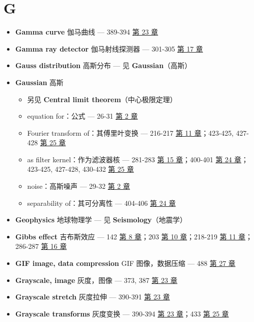 \section{G}

\begin{itemize}
\tightlist
\item
  \textbf{Gamma curve} 伽马曲线 --- 389-394 
  \hyperref[ch-23]{第 23 章}
\item
  \textbf{Gamma ray detector} 伽马射线探测器 --- 301-305 
  \hyperref[ch-17]{第 17 章}
\item
  \textbf{Gauss distribution} 高斯分布 --- 见 \textbf{Gaussian}（高斯）
\item
  \textbf{Gaussian} 高斯

  \begin{itemize}
  \tightlist
  \item
    另见 \textbf{Central limit theorem}（中心极限定理）
  \item
    equation for：公式 --- 26-31  \hyperref[ch-02]{第 2 章}
  \item
    Fourier transform of：其傅里叶变换 --- 216-217 
    \hyperref[ch-11]{第 11 章}；423-425, 427-428 
    \hyperref[ch-25]{第 25 章}
  \item
    as filter kernel：作为滤波器核 --- 281-283 
    \hyperref[ch-15]{第 15 章}；400-401  \hyperref[ch-24]{第
    24 章}；423-425, 427-428, 430-432  \hyperref[ch-25]{第 25
    章}
  \item
    noise：高斯噪声 --- 29-32  \hyperref[ch-02]{第 2 章}
  \item
    separability of：其可分离性 --- 404-406 
    \hyperref[ch-24]{第 24 章}
  \end{itemize}
\item
  \textbf{Geophysics} 地球物理学 --- 见 \textbf{Seismology}（地震学）
\item
  \textbf{Gibbs effect} 吉布斯效应 --- 142 
  \hyperref[ch-08]{第 8 章}；203  \hyperref[ch-10]{第 10
  章}；218-219  \hyperref[ch-11]{第 11 章}；286-287 
  \hyperref[ch-16]{第 16 章}
\item
  \textbf{GIF image, data compression} GIF 图像，数据压缩 --- 488
   \hyperref[ch-27]{第 27 章}
\item
  \textbf{Grayscale, image} 灰度，图像 --- 373, 387 
  \hyperref[ch-23]{第 23 章}
\item
  \textbf{Grayscale stretch} 灰度拉伸 --- 390-391 
  \hyperref[ch-23]{第 23 章}
\item
  \textbf{Grayscale transforms} 灰度变换 --- 390-394 
  \hyperref[ch-23]{第 23 章}；433  \hyperref[ch-25]{第 25 章}
\end{itemize}


